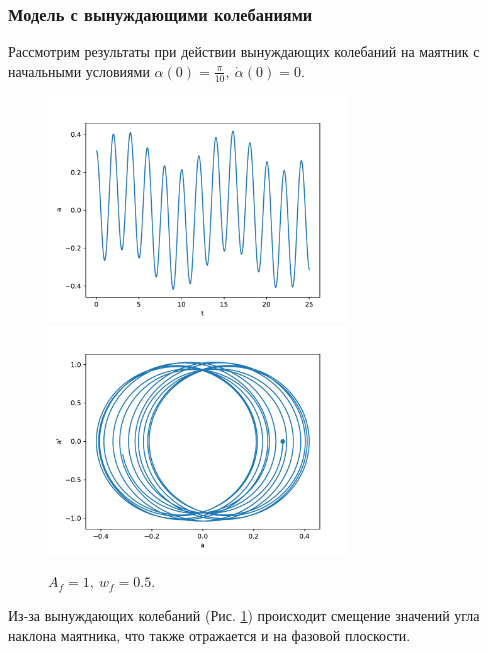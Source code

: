         \subsubsection{Модель с вынуждающими колебаниями}
            Рассмотрим результаты при действии вынуждающих колебаний на маятник с начальными условиями $\alpha(0) = \frac{\pi}{10}, ~ \dot{\alpha}(0) = 0$.
            \begin{figure}[H]
                \centering
                \includegraphics[width=8cm]{pictures/4resonance1.pdf}
                \includegraphics[width=8cm]{pictures/4resonance1p.pdf}
                \caption{$A_f = 1, ~ w_f = 0.5$.} \label{w05}
            \end{figure}
            Из-за вынуждающих колебаний (Рис. \ref{w05}) происходит смещение значений угла наклона маятника, что также отражается и на фазовой плоскости.

